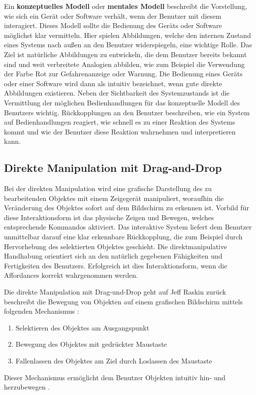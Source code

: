 Ein \textbf{konzeptuelles Modell} oder \textbf{mentales Modell} beschreibt die Vorstellung, wie sich ein Gerät oder Software verhält, wenn der Benutzer mit diesem interagiert. Dieses Modell sollte die Bedienung des Geräts oder Software möglichst klar vermitteln. Hier spielen Abbildungen, welche den internen Zustand eines Systems nach außen an den Benutzer widerspiegeln, eine wichtige Rolle. Das Ziel ist natürliche Abbildungen zu entwickeln, die dem Benutzer bereits bekannt sind und weit verbreitete Analogien abbilden, wie zum Beispiel die Verwendung der Farbe Rot zur Gefahrenanzeige oder Warnung. Die Bedienung eines Geräts oder einer Software wird dann als intuitiv bezeichnet, wenn gute direkte Abbildungen existieren. Neben der Sichtbarkeit des Systemzustands ist die Vermittlung der möglichen Bedienhandlungen für das konzeptuelle Modell des Benutzers wichtig. Rückkopplungen an den Benutzer beschreiben, wie ein System auf Bedienhandlungen reagiert, wie schnell es zu einer Reaktion des Systems kommt und wie der Benutzer diese Reaktion wahrnehmen und interpretieren kann. \cite[S. 136 ff.]{2010.Preim}

\subsection{Direkte Manipulation mit Drag-and-Drop}
Bei der direkten Manipulation wird eine grafische Darstellung des zu bearbeitenden Objektes mit einem Zeigegerät manipuliert, woraufhin die Veränderung des Objektes sofort auf dem Bildschirm zu erkennen ist. Vorbild für diese Interaktionsform ist das physische Zeigen und Bewegen, welches entsprechende Kommandos aktiviert. Das interaktive System liefert dem Benutzer unmittelbar darauf eine klar erkennbare Rückkopplung, die zum Beispiel durch Hervorhebung des selektierten Objektes geschieht. Die direktmanipulative Handhabung orientiert sich an den natürlich gegebenen Fähigkeiten und Fertigkeiten des Benutzers. Erfolgreich ist dies Interaktionsform, wenn die Affordances korrekt wahrgenommen werden. \cite[S. 351]{2010.Preim}

Die direkte Manipulation mit Drag-und-Drop geht auf Jeff Raskin zurück beschreibt die Bewegung von Objekten auf einem grafischen Bildschirm mittels folgenden Mechanismus \cite[S. 184]{2010.Preim}:
\begin{enumerate}
    \item Selektieren des Objektes am Ausgangspunkt \cite[S. 184]{2010.Preim}
    \item Bewegung des Objektes mit gedrückter Maustaste \cite[S. 184]{2010.Preim}
    \item Fallenlassen des Objektes am Ziel durch Loslassen des Maustaste \cite[S. 184]{2010.Preim}
\end{enumerate}
Dieser Mechanismus ermöglicht dem Benutzer Objekten intuitiv hin- und herzubewegen \cite[S. 129]{2010.Preim}.

